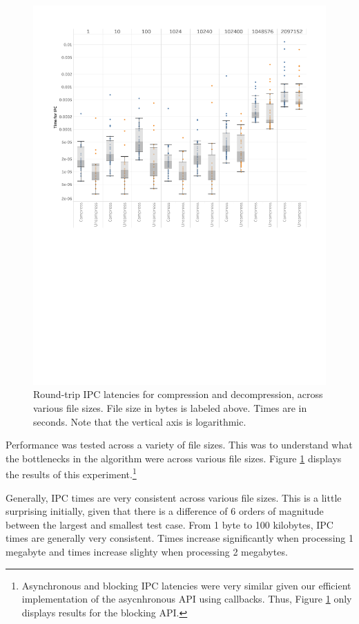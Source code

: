 \documentclass[paper=a4,fontsize=11pt]{report} %
\numberwithin{equation}{section} %
\numberwithin{figure}{section} %
\numberwithin{table}{section} %
\begin{document}
\begin{figure}[htb!]
  \includegraphics[width=\linewidth]{img/chart_full1.pdf}
  \caption{Round-trip IPC latencies for compression and decompression, across various file sizes. File size in bytes is labeled above. Times are in seconds. Note that the vertical axis is logarithmic.}
  \label{ipc_time_chart}
\end{figure}

Performance was tested across a variety of file sizes. This was to understand what the bottlenecks in the algorithm were across various file sizes. Figure \ref{ipc_time_chart} displays the results of this experiment.\footnote{Asynchronous and blocking IPC latencies were very similar given our efficient implementation of the asycnhronous API using callbacks. Thus, Figure \ref{ipc_time_chart} only displays results for the blocking API.}

Generally, IPC times are very consistent across various file sizes. This is a little surprising initially, given that there is a difference of 6 orders of magnitude between the largest and smallest test case. From 1 byte to 100 kilobytes, IPC times are generally very consistent. Times increase significantly when processing 1 megabyte and times increase slighty when processing 2 megabytes.
\end{document}
